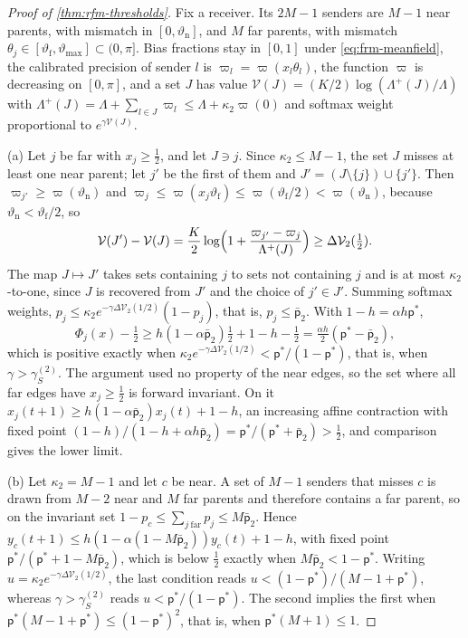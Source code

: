 \begin{proof}[Proof of \cref{thm:rfm-thresholds}]
Fix a receiver. Its $2M-1$ senders are $M-1$ near parents, with mismatch in $[0,\vartheta_{\mathrm n}]$, and $M$ far parents, with mismatch $\theta_j\in[\vartheta_{\mathrm f},\vartheta_{\max}]\subset(0,\pi]$. Bias fractions stay in $[0,1]$ under \eqref{eq:frm-meanfield}, the calibrated precision of sender $l$ is $\varpi_l=\varpi(x_l\theta_l)$, the function $\varpi$ is decreasing on $[0,\pi]$, and a set $J$ has value $\mathcal V(J)=(K/2)\log(\Lambda^+(J)/\Lambda)$ with $\Lambda^+(J)=\Lambda+\sum_{l\in J}\varpi_l\le\Lambda+\kappa_2\varpi(0)$ and softmax weight proportional to $e^{\gamma\mathcal V(J)}$.

(a) Let $j$ be far with $x_j\ge\frac12$, and let $J\ni j$. Since $\kappa_2\le M-1$, the set $J$ misses at least one near parent; let $j'$ be the first of them and $J'=(J\setminus\{j\})\cup\{j'\}$. Then $\varpi_{j'}\ge\varpi(\vartheta_{\mathrm n})$ and $\varpi_j\le\varpi(x_j\vartheta_{\mathrm f})\le\varpi(\vartheta_{\mathrm f}/2)<\varpi(\vartheta_{\mathrm n})$, because $\vartheta_{\mathrm n}<\vartheta_{\mathrm f}/2$, so
\begin{equation*}
\mathcal V(J')-\mathcal V(J)=\frac K2\log\Bigl(1+\frac{\varpi_{j'}-\varpi_j}{\Lambda^+(J)}\Bigr)\ge\Delta\mathcal V_2(\tfrac12).
\end{equation*}
The map $J\mapsto J'$ takes sets containing $j$ to sets not containing $j$ and is at most $\kappa_2$-to-one, since $J$ is recovered from $J'$ and the choice of $j'\in J'$. Summing softmax weights, $p_j\le\kappa_2e^{-\gamma\Delta\mathcal V_2(1/2)}(1-p_j)$, that is, $p_j\le\bar{\mathsf p}_2$. With $1-h=\alpha h\mathsf p^\ast$,
\begin{equation*}
\Phi_j(x)-\tfrac12\ge h(1-\alpha\bar{\mathsf p}_2)\tfrac12+1-h-\tfrac12=\tfrac{\alpha h}{2}(\mathsf p^\ast-\bar{\mathsf p}_2),
\end{equation*}
which is positive exactly when $\kappa_2e^{-\gamma\Delta\mathcal V_2(1/2)}<\mathsf p^\ast/(1-\mathsf p^\ast)$, that is, when $\gamma>\gamma_S^{(2)}$. The argument used no property of the near edges, so the set where all far edges have $x_j\ge\frac12$ is forward invariant. On it $x_j(t+1)\ge h(1-\alpha\bar{\mathsf p}_2)x_j(t)+1-h$, an increasing affine contraction with fixed point $(1-h)/(1-h+\alpha h\bar{\mathsf p}_2)=\mathsf p^\ast/(\mathsf p^\ast+\bar{\mathsf p}_2)>\frac12$, and comparison gives the lower limit.

(b) Let $\kappa_2=M-1$ and let $c$ be near. A set of $M-1$ senders that misses $c$ is drawn from $M-2$ near and $M$ far parents and therefore contains a far parent, so on the invariant set $1-p_c\le\sum_{j\ \mathrm{far}}p_j\le M\bar{\mathsf p}_2$. Hence $y_c(t+1)\le h(1-\alpha(1-M\bar{\mathsf p}_2))y_c(t)+1-h$, with fixed point $\mathsf p^\ast/(\mathsf p^\ast+1-M\bar{\mathsf p}_2)$, which is below $\frac12$ exactly when $M\bar{\mathsf p}_2<1-\mathsf p^\ast$. Writing $u=\kappa_2e^{-\gamma\Delta\mathcal V_2(1/2)}$, the last condition reads $u<(1-\mathsf p^\ast)/(M-1+\mathsf p^\ast)$, whereas $\gamma>\gamma_S^{(2)}$ reads $u<\mathsf p^\ast/(1-\mathsf p^\ast)$. The second implies the first when $\mathsf p^\ast(M-1+\mathsf p^\ast)\le(1-\mathsf p^\ast)^2$, that is, when $\mathsf p^\ast(M+1)\le1$.


\end{proof}

